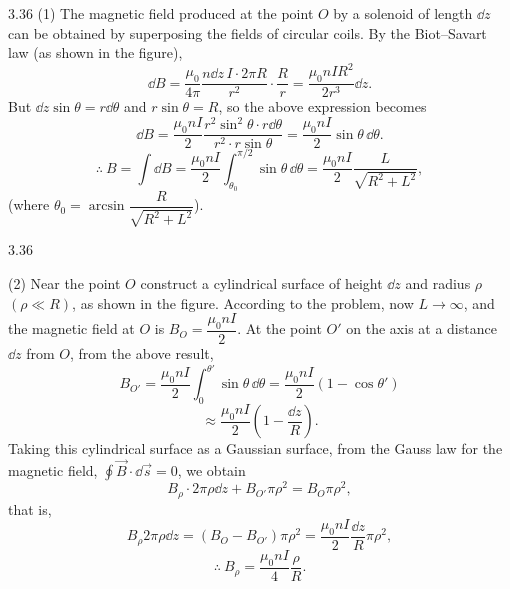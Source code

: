\begin{solution}{3.36}
(1) The magnetic field produced at the point $O$ by a solenoid of length $\dd z$ can be obtained by superposing the fields of circular coils. By the Biot--Savart law (as shown in the figure),
\[
\dd B=\frac{\mu_0}{4\pi}\frac{n\dd z\,I\cdot2\pi R}{r^2}\cdot\frac{R}{r}
=\frac{\mu_0nIR^2}{2r^3}\dd z .
\]
But $\dd z\sin\theta=r\dd\theta$ and $r\sin\theta=R$, so the above expression becomes
\[
\dd B=\frac{\mu_0nI}{2}\frac{r^2\sin^2\theta\cdot r\dd\theta}{r^2\cdot r\sin\theta}
=\frac{\mu_0nI}{2}\sin\theta\,\dd\theta .
\]
\[
\therefore\ B=\int\dd B=\frac{\mu_0nI}{2}\int_{\theta_0}^{\pi/2}\sin\theta\,\dd\theta
=\frac{\mu_0nI}{2}\frac{L}{\sqrt{R^2+L^2}},
\]
(where $\theta_0=\arcsin\dfrac{R}{\sqrt{R^2+L^2}}$).

\begin{figbox}{3.36}
\end{figbox}

(2) Near the point $O$ construct a cylindrical surface of height $\dd z$ and radius $\rho$ $(\rho\ll R)$, as shown in the figure. According to the problem, now $L\to\infty$, and the magnetic field at $O$ is $B_O=\dfrac{\mu_0nI}{2}$. At the point $O'$ on the axis at a distance $\dd z$ from $O$, from the above result,
\[
B_{O'}=\frac{\mu_0nI}{2}\int_0^{\theta'}\sin\theta\,\dd\theta
=\frac{\mu_0nI}{2}\left(1-\cos\theta'\right)
\]
\[
\approx\frac{\mu_0nI}{2}\left(1-\frac{\dd z}{R}\right).
\]
Taking this cylindrical surface as a Gaussian surface, from the Gauss law for the magnetic field, $\oint\vec{B}\cdot\dd\vec{s}=0$, we obtain
\[
B_\rho\cdot2\pi\rho\dd z+B_{O'}\pi\rho^2=B_O\pi\rho^2,
\]
that is,
\[
B_\rho2\pi\rho\dd z=\left(B_O-B_{O'}\right)\pi\rho^2=\frac{\mu_0nI}{2}\frac{\dd z}{R}\pi\rho^2,
\]
\[
\therefore\ B_\rho=\frac{\mu_0nI}{4}\frac{\rho}{R}.
\]
\end{solution}

